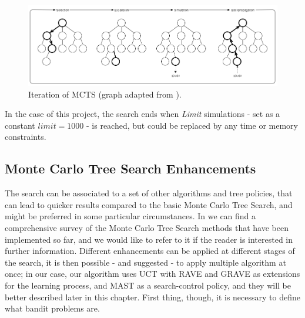\begin{figure}[ht]
    \centering 
    \includegraphics[scale=0.4]{figure/MCTS.png}
    \caption{Iteration of MCTS (graph adapted from \cite{browne2012survey,chaslot2008progressive,winands2010monte}).}
    \label{fig:mcts}
\end{figure}
In the case of this project, the search ends when \emph{Limit} simulations - set as a constant $limit = 1000$ - is reached, but could be replaced by any time or memory constraints. 
\subsection{Monte Carlo Tree Search Enhancements}
The search can be associated to a set of other algorithms and tree policies, that can lead to quicker results compared to the basic Monte Carlo Tree Search, and might be preferred in some particular circumstances. In \cite{browne2012survey} we can find a comprehensive survey of the Monte Carlo Tree Search methods that have been implemented so far, and we would like to refer to it if the reader is interested in further information. Different enhancements can be applied at different stages of the search, it is then possible - and suggested - to apply multiple algorithm at once\cite{finnsson2010learning}; in our case, our algorithm uses UCT with RAVE and GRAVE as extensions for the learning process, and MAST as a search-control policy, and they will be better described later in this chapter. First thing, though, it is necessary to define what bandit problems are.
